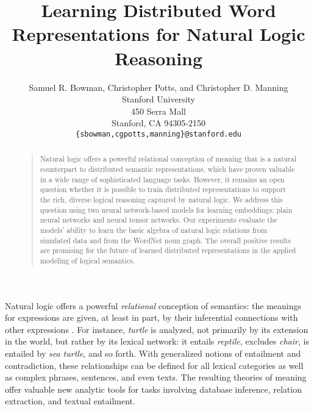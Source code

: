 \documentclass[letterpaper]{article}
\newcommand{\word}[1]{\emph{#1}}
\begin{document}
%
\title{Learning Distributed Word Representations for Natural Logic Reasoning}
\author{Samuel R. Bowman, Christopher Potts, and Christopher D. Manning\\
  Stanford University\\
  450 Serra Mall \\
  Stanford, CA 94305-2150\\
  \texttt{\{sbowman,cgpotts,manning\}@stanford.edu}} %
\maketitle
\begin{abstract}
\begin{quote}
  Natural logic offers a powerful relational conception of meaning
  that is a natural counterpart to distributed semantic
  representations, which have proven valuable in a wide range of
  sophisticated language tasks. However, it remains an open question
  whether it is possible to train distributed representations to
  support the rich, diverse logical reasoning captured by natural
  logic. We address this question using two neural network-based
  models for learning embeddings: plain neural networks and neural
  tensor networks. Our experiments evaluate the models' ability to
  learn the basic algebra of natural logic relations from simulated
  data and from the WordNet noun graph.  The overall positive results
  are promising for the future of learned distributed representations in
  the applied modeling of logical semantics.
\end{quote}
\end{abstract}

Natural logic offers a powerful \emph{relational} conception of
semantics: the meanings for expressions are given, at least in part,
by their inferential connections with other expressions
\cite{Katz72,maccartney2009extended,vanBenthem08NATLOG}. For instance,
\word{turtle} is analyzed, not primarily by its extension in the
world, but rather by its lexical network: it entails \word{reptile},
excludes \word{chair}, is entailed by \word{sea
  turtle}, and so forth. With generalized notions of entailment and
contradiction, these relationships can be defined for all lexical
categories as well as complex phrases, sentences, and even texts. The
resulting theories of meaning offer valuable new analytic tools for
tasks involving database inference, relation extraction, and textual
entailment.
\end{document}
